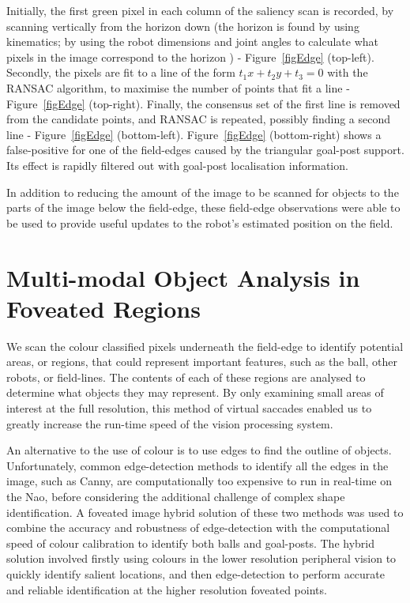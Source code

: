 \documentclass[runningheads,a4paper]{llncs}
\begin{document}
Initially, the first green pixel in each column of the saliency scan is
recorded, by scanning vertically from the horizon down (the horizon is found by
using kinematics; by using the robot dimensions and joint angles to calculate what pixels in the image correspond to the horizon \cite{cse10rUNSWift2010}) -
Figure~\ref{figEdge} (top-left). %
Secondly, the pixels are fit to a line of
the form $t_1x + t_2y + t_3 = 0$ with the RANSAC algorithm, to maximise the
number of points that fit a line - Figure~\ref{figEdge} (top-right). Finally,
the consensus set of the first line is removed from the candidate points, and
RANSAC is repeated, possibly finding a second line - Figure~\ref{figEdge}
(bottom-left). Figure~\ref{figEdge} (bottom-right) shows a false-positive for
one of the field-edges caused by the triangular goal-post support. Its effect is
rapidly filtered out with goal-post localisation information.

In addition to reducing the amount of the image to be scanned for objects to the
parts of the image below the field-edge, these field-edge observations were able
to be used to provide useful updates to the robot's estimated position on the
field.\cite{hengst10robocup}

\section{Multi-modal Object Analysis in Foveated Regions}

We scan the colour classified pixels underneath the field-edge to identify potential areas, or regions, that could represent important features, such as the ball, other robots, or field-lines. The contents of each of these regions are analysed to determine what objects they may represent. By only examining small areas of interest at the full resolution, this method of virtual saccades enabled us to greatly increase the run-time speed of the vision processing system.

An alternative to the use of colour is to use edges to find the outline of
objects. Unfortunately, common edge-detection methods to identify all the edges
in the image, such as Canny, are computationally too expensive to run in
real-time on the Nao, before considering the additional challenge of complex
shape identification. A foveated image hybrid solution of these two methods was
used to combine the accuracy and robustness of edge-detection with the
computational speed of colour calibration to identify both balls and goal-posts.
The hybrid solution involved firstly using colours in the lower resolution
peripheral vision to quickly identify salient locations, and then edge-detection
to perform accurate and reliable identification at the higher resolution
foveated points.
\end{document}
